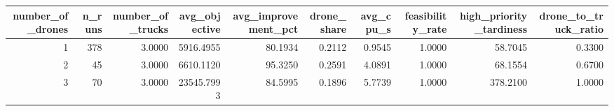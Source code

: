 \begin{tabular}{rrrrrrrrrr}
\toprule
number_of_drones & n_runs & number_of_trucks & avg_objective & avg_improvement_pct & drone_share & avg_cpu_s & feasibility_rate & high_priority_tardiness & drone_to_truck_ratio \\
\midrule
1 & 378 & 3.0000 & 5916.4955 & 80.1934 & 0.2112 & 0.9545 & 1.0000 & 58.7045 & 0.3300 \\
2 & 45 & 3.0000 & 6610.1120 & 95.3250 & 0.2591 & 4.0891 & 1.0000 & 68.1554 & 0.6700 \\
3 & 70 & 3.0000 & 23545.7993 & 84.5995 & 0.1896 & 5.7739 & 1.0000 & 378.2100 & 1.0000 \\
\bottomrule
\end{tabular}

